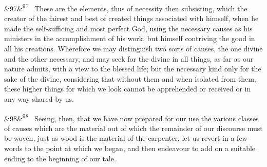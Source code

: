 \documentclass[12pt]{article}
\newcommand{\para}[1][]{\par\noindent\ifx&#1&\else\textsuperscript{\footnotesize #1}~\fi}
\begin{document}
\para[97] These are the elements, thus of necessity then subsisting, which the creator of the fairest and best of created things associated with himself, when he made the self-sufficing and most perfect God, using the necessary causes as his ministers in the accomplishment of his work, but himself contriving the good in all his creations. Wherefore we may distinguish two sorts of causes, the one divine and the other necessary, and may seek for the divine in all things, as far as our nature admits, with a view to the blessed life; but the necessary kind only for the sake of the divine, considering that without them and when isolated from them, these higher things for which we look cannot be apprehended or received or in any way shared by us.

\para[98] Seeing, then, that we have now prepared for our use the various classes of causes which are the material out of which the remainder of our discourse must be woven, just as wood is the material of the carpenter, let us revert in a few words to the point at which we began, and then endeavour to add on a suitable ending to the beginning of our tale.
\end{document}
